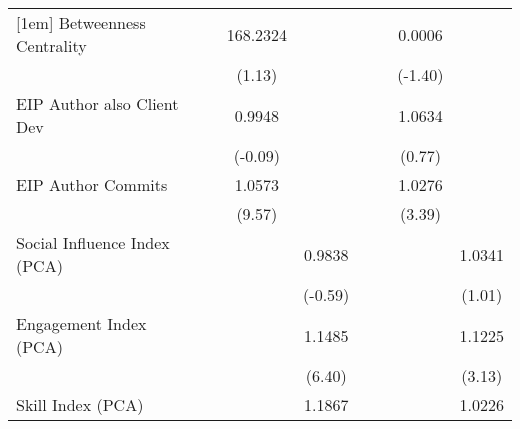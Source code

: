 {\begin{tabular}{l*{8}{c}}
[1em]
Betweenness Centrality             &                     &                     &    168.2324         &                     &                     &                     &      0.0006         &                     \\
                                   &                     &                     &      (1.13)         &                     &                     &                     &     (-1.40)         &                     \\
[1em]
EIP Author also Client Dev         &                     &                     &      0.9948         &                     &                     &                     &      1.0634         &                     \\
                                   &                     &                     &     (-0.09)         &                     &                     &                     &      (0.77)         &                     \\
[1em]
EIP Author Commits                 &                     &                     &      1.0573\sym{***}&                     &                     &                     &      1.0276\sym{***}&                     \\
                                   &                     &                     &      (9.57)         &                     &                     &                     &      (3.39)         &                     \\
[1em]
Social Influence Index (PCA)       &                     &                     &                     &      0.9838         &                     &                     &                     &      1.0341         \\
                                   &                     &                     &                     &     (-0.59)         &                     &                     &                     &      (1.01)         \\
[1em]
Engagement Index (PCA)             &                     &                     &                     &      1.1485\sym{***}&                     &                     &                     &      1.1225\sym{***}\\
                                   &                     &                     &                     &      (6.40)         &                     &                     &                     &      (3.13)         \\
[1em]
Skill Index (PCA)                  &                     &                     &                     &      1.1867\sym{***}&                     &                     &                     &      1.0226         \\

\end{tabular}}
